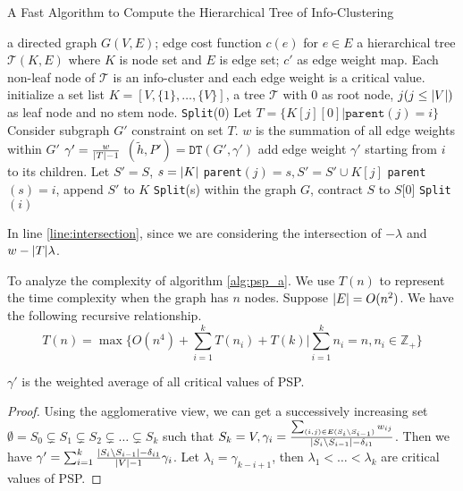 \documentclass{article}
\begin{document}
\begin{algorithm}
\caption{A Fast Algorithm to Compute the Hierarchical Tree of Info-Clustering}\label{alg:psp_a}
\begin{algorithmic}[1]
\REQUIRE a directed graph $G(V, E)$; edge cost function $c(e)$ for $e\in E$
\ENSURE a hierarchical tree $\mathcal{T}(K, E)$ where $K$ is node set and $E$ is edge set; $c'$ as edge weight map. Each non-leaf node of $\mathcal{T}$ is an info-cluster and each edge weight is a critical value. 
\STATE initialize a set list $K=[V, \{1\}, \dots, \{V\}]$, a tree $\mathcal{T}$ with 0 as root node, $j(j\leq \lvert V\rvert)$ as leaf node and no stem node.
\STATE \texttt{Split}(0)
\STATE Let $T=\{K[j][0] | \texttt{parent}(j) = i\}$
\STATE Consider subgraph $G'$ constraint on set $T$. $w$ is the summation of all edge weights within $G'$ 
\STATE $\gamma' = \frac{w}{\lvert T\rvert-1}$ \label{line:intersection}  \label{alg:T}
\STATE $(\tilde{h}, P') = \texttt{DT}(G', \gamma')$
\STATE add edge weight $\gamma'$ starting from $i$ to its children. \label{alg:add_lambda}
\ELSE
{}
\STATE Let $S'=S$, $s=\lvert K\rvert$%
\STATE \texttt{parent}$(j)=s, S'=S'\cup K[j]$
\ENDIF
\ENDFOR
\STATE \texttt{parent}$(s)=i$, append $S'$ to $K$
\STATE \texttt{Split}(s)
\STATE within the graph $G$, contract $S$ to $S$[0]
\ENDFOR
\STATE \texttt{Split}$(i)$ %
\ENDIF
\ENDFUNCTION
\end{algorithmic}
\end{algorithm}
In line \ref{line:intersection}, since we are considering the intersection of $-\lambda$ and $w-\lvert T\rvert\lambda $.

To analyze the complexity of algorithm \ref{alg:psp_a}.
We use $T(n)$ to represent the time complexity when the graph has $n$ nodes. Suppose $\lvert E\rvert = O(n^2)$. We have the following recursive relationship.
\begin{equation}
	T(n) = \max \{ O(n^4) + \sum_{i=1}^k T(n_i) + T(k) | \sum_{i=1}^k n_i = n, n_i \in \mathbb{Z}_{+} \}
\end{equation}	
\begin{lemma}
	$\gamma'$ is the weighted average of all critical values of PSP.
\end{lemma}	
\begin{proof}
	Using the agglomerative view, we can get a successively increasing set $\emptyset = S_0 \subsetneq S_1 \subsetneq S_2 \subsetneq \dots \subsetneq S_k$ such that $S_k = V, \gamma_i = \frac{\sum_{(i,j) \in E(S_i\backslash S_{i-1})} w_{ij}}{\lvert S_i\backslash S_{i-1}\rvert- \delta_{i1}}$. Then we have $\gamma' = \sum_{i=1}^k \frac{\lvert S_i \backslash S_{i-1}\rvert - \delta_{i1}}{\lvert V\rvert - 1}\gamma_i$. Let $\lambda_i = \gamma_{k-i+1}$, then $\lambda_1 < \dots < \lambda_k$ are critical values of PSP.
\end{proof}		
\end{document}
